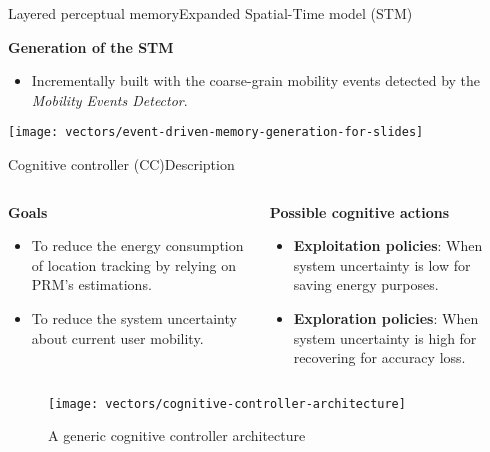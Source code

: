 \begin{frame}[noframenumbering]{Layered perceptual memory}{Expanded Spatial-Time model (STM)}
\small
\begin{block}{\small \textbf{Generation of the STM}}
\begin{itemize}
    \item Incrementally built with the coarse-grain mobility events detected by the \emph{Mobility Events Detector}.
\end{itemize}
{
  \centering
  \texttt{[image: vectors/event-driven-memory-generation-for-slides]}
  \par
}
\end{block}
\end{frame}


\begin{frame}[noframenumbering]{Cognitive controller (CC)}{Description}
\small
\vspace{-0.5cm}
\begin{columns}
\begin{column}[T]{0.5\textwidth}
\begin{block}{\small \textbf{Goals}}
  \begin{itemize}
      \item To reduce the energy consumption of location tracking by relying on PRM's estimations.
      \item To reduce the system uncertainty about current user mobility.
  \end{itemize}
\end{block}
\end{column}

\begin{column}[T]{0.5\textwidth}
\begin{block}{\small \textbf{Possible cognitive actions}}
  \begin{itemize}
    \item \textbf{Exploitation policies}: When system uncertainty is low for saving energy purposes.
    \item \textbf{Exploration policies}: When system uncertainty is high for recovering for accuracy loss.
  \end{itemize}
\end{block}
\end{column}
\end{columns}

\begin{figure}
  \centering
  \texttt{[image: vectors/cognitive-controller-architecture]}
  \caption{A generic cognitive controller architecture}
\end{figure}
\end{frame}

